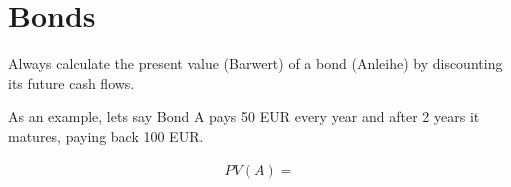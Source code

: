 \documentclass[a4paper]{article}
\begin{document}
    \tableofcontents
    \pagebreak

    \section{
        Bonds
    }

    Always calculate the present value (Barwert) of a bond (Anleihe) by 
    discounting its future cash flows.

    As an example, lets say Bond A pays 50 EUR every year and after 2 years it matures,
    paying back 100 EUR.

    \begin{align*}
        PV(A) = 
    \end{align*}
\end{document}
